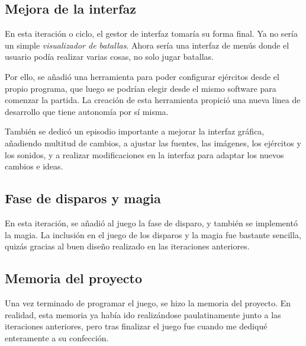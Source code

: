 \subsection{Mejora de la interfaz}
En esta iteración o ciclo, el gestor de interfaz tomaría su forma
final. Ya no sería un simple \emph{visualizador de batallas}. Ahora
sería una interfaz de menús donde el usuario podía realizar varias
cosas, no solo jugar batallas.

Por ello, se añadió una herramienta para poder configurar ejércitos
desde el propio programa, que luego se podrían elegir desde el mismo
software para comenzar la partida. La creación de esta herramienta
propició una nueva linea de desarrollo que tiene autonomía por sí
misma.

También se dedicó un episodio importante a mejorar
la interfaz gráfica, añadiendo multitud de cambios, a ajustar las
fuentes, las imágenes, los ejércitos y los sonidos, y a realizar
modificaciones en la interfaz para adaptar los nuevos cambios e ideas.

\subsection{Fase de disparos y magia}
En esta iteración, se añadió al juego la fase de disparo, y también se
implementó la magia. La inclusión en el juego de los disparos y la
magia fue bastante sencilla, quizás gracias al buen diseño realizado en las
iteraciones anteriores.

\subsection{Memoria del proyecto}
Una vez terminado de programar el juego, se hizo la memoria del
proyecto. En realidad, esta memoria ya había ido realizándose
paulatinamente junto a las iteraciones anteriores, pero tras finalizar el
juego fue cuando me dediqué enteramente a su confección.

